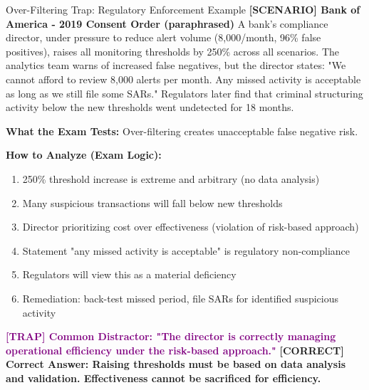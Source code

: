 \documentclass[11pt,a4paper]{beamer}
\newcommand{\trap}[1]{\textcolor{purple}{\textbf{[TRAP] #1}}}
\newcommand{\correct}[1]{\textcolor{green!50!black}{\textbf{[CORRECT] #1}}}
\newcommand{\scenario}[1]{\textcolor{blue!70!black}{\textbf{[SCENARIO] #1}}}
\begin{document}
\begin{frame}{Over-Filtering Trap: Regulatory Enforcement Example}
	\scenario{Bank of America - 2019 Consent Order (paraphrased)}
	A bank's compliance director, under pressure to reduce alert volume (8,000/month, 96\% false positives), raises all monitoring thresholds by 250\% across all scenarios. The analytics team warns of increased false negatives, but the director states: "We cannot afford to review 8,000 alerts per month. Any missed activity is acceptable as long as we still file some SARs." Regulators later find that criminal structuring activity below the new thresholds went undetected for 18 months.
	
	\vspace{0.1cm}
	\textbf{What the Exam Tests:} Over-filtering creates unacceptable false negative risk.
	
	\vspace{0.1cm}
	\textbf{How to Analyze (Exam Logic):}
	\begin{enumerate}
		\item 250\% threshold increase is extreme and arbitrary (no data analysis)
		\item Many suspicious transactions will fall below new thresholds
		\item Director prioritizing cost over effectiveness (violation of risk-based approach)
		\item Statement "any missed activity is acceptable" is regulatory non-compliance
		\item Regulators will view this as a material deficiency
		\item Remediation: back-test missed period, file SARs for identified suspicious activity
	\end{enumerate}
	
	\trap{Common Distractor: "The director is correctly managing operational efficiency under the risk-based approach."}
	\correct{Correct Answer: Raising thresholds must be based on data analysis and validation. Effectiveness cannot be sacrificed for efficiency.}
\end{frame}
\end{document}
